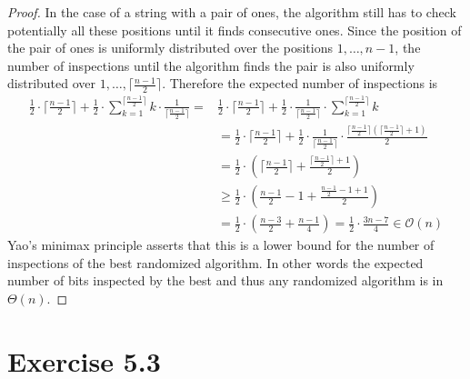\documentclass[10pt,a4paper]{article}
\begin{document}
\begin{proof}
  In the case of a string with a pair of ones, the algorithm still has to check potentially all these positions until it finds consecutive ones.
  Since the position of the pair of ones is uniformly distributed over the positions $1, \dots, n - 1$, the number of inspections until the algorithm finds the pair is also uniformly distributed over $1, \dots, \lceil \frac{n - 1}{2} \rceil$.
  Therefore the expected number of inspections is
  \begin{align*}
    \frac{1}{2} \cdot \lceil \frac{n - 1}{2} \rceil + \frac{1}{2} \cdot \sum_{k = 1}^{\lceil \frac{n - 1}{2} \rceil} k \cdot \frac{1}{\lceil \frac{n - 1}{2} \rceil} = & \frac{1}{2} \cdot \lceil \frac{n - 1}{2} \rceil + \frac{1}{2} \cdot \frac{1}{\lceil \frac{n - 1}{2} \rceil} \cdot \sum_{k = 1}^{\lceil \frac{n - 1}{2} \rceil} k\\
                                                                                                                                                                       & = \frac{1}{2} \cdot \lceil \frac{n - 1}{2} \rceil + \frac{1}{2} \cdot \frac{1}{\lceil \frac{n - 1}{2} \rceil} \cdot \frac{\lceil \frac{n - 1}{2} \rceil (\lceil \frac{n - 1}{2} \rceil + 1)}{2}\\
                                                                                                                                                                       & = \frac{1}{2} \cdot \left( \lceil \frac{n - 1}{2} \rceil + \frac{\lceil \frac{n - 1}{2} \rceil + 1}{2} \right)\\
                                                                                                                                                                       & \ge \frac{1}{2} \cdot \left(  \frac{n - 1}{2} - 1 + \frac{\frac{n - 1}{2} - 1 + 1}{2} \right)\\
                                                                                                                                                                       & = \frac{1}{2} \cdot \left(  \frac{n - 3}{2} + \frac{n - 1}{4} \right) = \frac{1}{2} \cdot \frac{3n - 7}{4} \in \mathcal{O}(n)
  \end{align*}
  Yao's minimax principle asserts that this is a lower bound for the number of inspections of the best randomized algorithm.
  In other words the expected number of bits inspected by the best and thus any randomized algorithm is in $\Theta(n)$.
\end{proof}

\section*{Exercise 5.3}
\end{document}
